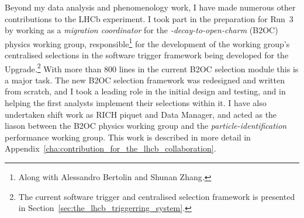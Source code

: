Beyond my data analysis and phenomenology work, I have made numerous other contributions to the LHCb experiment. I took part in the preparation for Run~3 by working as a \emph{migration coordinator} for the \emph{\B-decay-to-open-charm} (B2OC) physics working group, responsible\footnote{Along with Alessandro Bertolin and Shunan Zhang.} for the development of the working group's centralised selections in the software trigger framework being developed for the \lhcb Upgrade.\footnote{The current software trigger and centralised selection framework is presented in Section~\ref{sec:the_lhcb_triggerring_system}.} With more than 800 lines in the current B2OC selection module this is a major task. The new B2OC selection framework was redesigned and written from scratch, and I took a leading role in the initial design and testing, and in helping the first analysts implement their selections within it. I have also undertaken shift work as RICH piquet and Data Manager, and acted as the liason between the B2OC physics working group and the \emph{particle-identification} performance working group. This work is described in more detail in Appendix~\ref{cha:contribution_for_the_lhcb_collaboration}.


